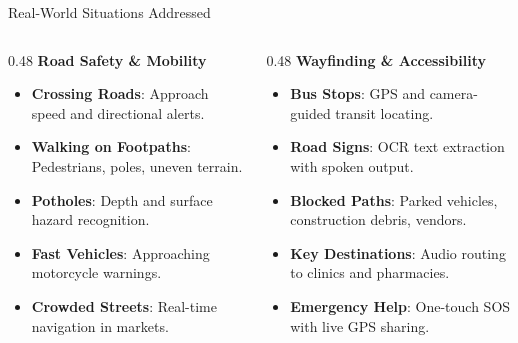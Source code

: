 \begin{frame}{Real-World Situations Addressed}
\begin{columns}[T]
  \begin{column}{0.48\textwidth}
    {\large\textbf{\textcolor{MyUnivGreen}{Road Safety \& Mobility}}}\\[6pt]
    \begin{itemize}
      \item \textbf{Crossing Roads}: Approach speed and directional alerts.
      \item \textbf{Walking on Footpaths}: Pedestrians, poles, uneven terrain.
      \item \textbf{Potholes}: Depth and surface hazard recognition.
      \item \textbf{Fast Vehicles}: Approaching motorcycle warnings.
      \item \textbf{Crowded Streets}: Real-time navigation in markets.
    \end{itemize}
  \end{column}
  
  \begin{column}{0.48\textwidth}
    {\large\textbf{\textcolor{MyUnivGreen}{Wayfinding \& Accessibility}}}\\[6pt]
    \begin{itemize}
      \item \textbf{Bus Stops}: GPS and camera-guided transit locating.
      \item \textbf{Road Signs}: OCR text extraction with spoken output.
      \item \textbf{Blocked Paths}: Parked vehicles, construction debris, vendors.
      \item \textbf{Key Destinations}: Audio routing to clinics and pharmacies.
      \item \textbf{Emergency Help}: One-touch SOS with live GPS sharing.
    \end{itemize}
  \end{column}
\end{columns}
\end{frame}
